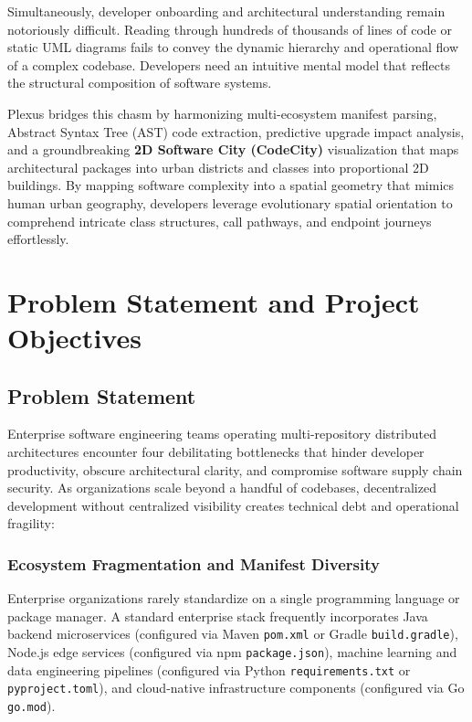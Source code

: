\documentclass[11pt,a4paper,openany]{report}
\begin{document}
Simultaneously, developer onboarding and architectural understanding remain notoriously difficult. Reading through hundreds of thousands of lines of code or static UML diagrams fails to convey the dynamic hierarchy and operational flow of a complex codebase. Developers need an intuitive mental model that reflects the structural composition of software systems. 

Plexus bridges this chasm by harmonizing multi-ecosystem manifest parsing, Abstract Syntax Tree (AST) code extraction, predictive upgrade impact analysis, and a groundbreaking \textbf{2D Software City (CodeCity)} visualization that maps architectural packages into urban districts and classes into proportional 2D buildings. By mapping software complexity into a spatial geometry that mimics human urban geography, developers leverage evolutionary spatial orientation to comprehend intricate class structures, call pathways, and endpoint journeys effortlessly.


\chapter{Problem Statement and Project Objectives}

\section{Problem Statement}
Enterprise software engineering teams operating multi-repository distributed architectures encounter four debilitating bottlenecks that hinder developer productivity, obscure architectural clarity, and compromise software supply chain security. As organizations scale beyond a handful of codebases, decentralized development without centralized visibility creates technical debt and operational fragility:

\subsection{Ecosystem Fragmentation and Manifest Diversity}
Enterprise organizations rarely standardize on a single programming language or package manager. A standard enterprise stack frequently incorporates Java backend microservices (configured via Maven \texttt{pom.xml} or Gradle \texttt{build.gradle}), Node.js edge services (configured via npm \texttt{package.json}), machine learning and data engineering pipelines (configured via Python \texttt{requirements.txt} or \texttt{pyproject.toml}), and cloud-native infrastructure components (configured via Go \texttt{go.mod}). 
\end{document}
